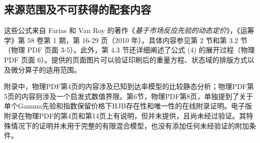 \documentclass{article}
\begin{document}
\subsection*{来源范围及不可获得的配套内容}
这些公式来自 Farias 和 Van Roy 的著作《\emph{基于市场反应先验的动态定价}》，《运筹学》第 58 卷第 1 期，第 16-29 页（2010 年）。具体内容参见第 2 节和第 3.2 节（物理 PDF 页面 3-5）。此外，第 4.3 节还详细阐述了公式 (4) 的展开过程（物理 PDF 页面 6）。提供的页面图片可以验证印刷后的重量方程、状态域的排版方式以及微分算子的适用范围。

附录中，物理PDF第4页的内容涉及已知到达率模型的比较静态分析；物理PDF第5页的内容则涉及一个启发式数值界限。第6节，物理PDF第8页，单独提到了关于单个Gamma先验和指数保留价格下HJB存在性和唯一性的在线附录证明。电子版附录在物理PDF的第4页和第14页上有说明，但并未提供，且尚未经过验证。其特殊情况下的证明并未用于完整的有限混合模型，也没有添加任何未经验证的附加条件。
\end{document}
